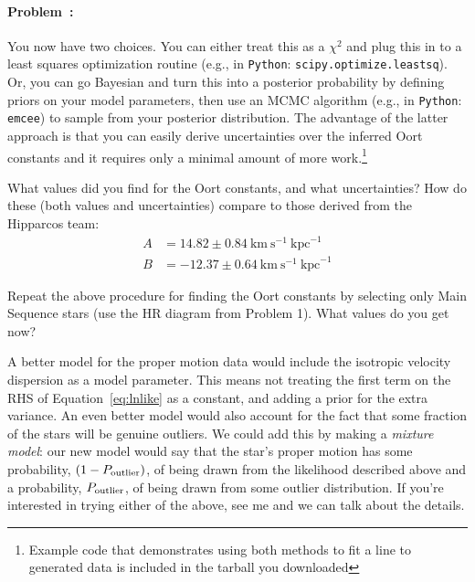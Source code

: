 \documentclass[12pt,twoside]{article}
\newcommand{\problemname}{Problem}
\newcounter{problem}
\newenvironment{problem}{\paragraph{\problemname~\theproblem:}\refstepcounter{problem}}{}
\begin{document}
\begin{problem}
You now have two choices. You can either treat this as a $\chi^2$ and plug this in to a least squares optimization routine (e.g., in \texttt{Python}: \texttt{scipy.optimize.leastsq}). Or, you can go Bayesian and turn this into a posterior probability by defining priors on your model parameters, then use an MCMC algorithm (e.g., in \texttt{Python}: \texttt{emcee}) to sample from your posterior distribution. The advantage of the latter approach is that you can easily derive uncertainties over the inferred Oort constants and it requires only a minimal amount of more work.\footnote{Example code that demonstrates using both methods to fit a line to generated data is included in the tarball you downloaded}

What values did you find for the Oort constants, and what uncertainties? How do these (both values and uncertainties) compare to those derived from the Hipparcos team:
\begin{align}
	A &= 14.82 \pm 0.84~\mathrm{km}~\mathrm{s}^{-1}~\mathrm{kpc}^{-1}\\
	B &= -12.37 \pm 0.64~\mathrm{km}~\mathrm{s}^{-1}~\mathrm{kpc}^{-1}
\end{align}

Repeat the above procedure for finding the Oort constants by selecting only Main Sequence stars (use the HR diagram from Problem 1). What values do you get now? 

\pagebreak
{} A better model for the proper motion data would include the isotropic velocity dispersion as a model parameter. This means not treating the first term on the RHS of Equation~\ref{eq:lnlike} as a constant, and adding a prior for the extra variance. An even better model would also account for the fact that some fraction of the stars will be genuine outliers. We could add this by making a \emph{mixture model}: our new model would say that the star's proper motion has some probability, $(1-P_{\rm outlier})$, of being drawn from the likelihood described above and a probability, $P_{\rm outlier}$, of being drawn from some outlier distribution. If you're interested in trying either of the above, see me and we can talk about the details.

\end{problem}
\end{document}
